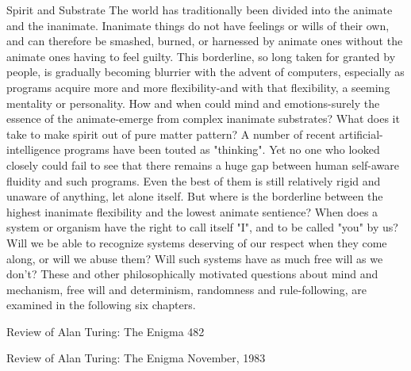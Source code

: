                                                       Spirit and Substrate
         The world has traditionally been divided into the animate and the inanimate.
Inanimate things do not have feelings or wills of their own, and can therefore be
smashed, burned, or harnessed by animate ones without the animate ones having to
feel guilty. This borderline, so long taken for granted by people, is gradually
becoming blurrier with the advent of computers, especially as programs acquire more
and more flexibility-and with that flexibility, a seeming mentality or personality. How
and when could mind and emotions-surely the essence of the animate-emerge from
complex inanimate substrates? What does it take to make spirit out of pure matter
pattern? A number of recent artificial-intelligence programs have been touted as
"thinking". Yet no one who looked closely could fail to see that there remains a huge
gap between human self-aware fluidity and such programs. Even the best of them is
still relatively rigid and unaware of anything, let alone itself. But where is the
borderline between the highest inanimate flexibility and the lowest animate sentience?
When does a system or organism have the right to call itself "I", and to be called
"you" by us? Will we be able to recognize systems deserving of our respect when they
come along, or will we abuse them? Will such systems have as much free will as we
don't? These and other philosophically motivated questions about mind and
mechanism, free will and determinism, randomness and rule-following, are examined
in the following six chapters.




Review of Alan Turing: The Enigma                                                  482


                         Review of Alan Turing:
                              The Enigma
                                   November, 1983

